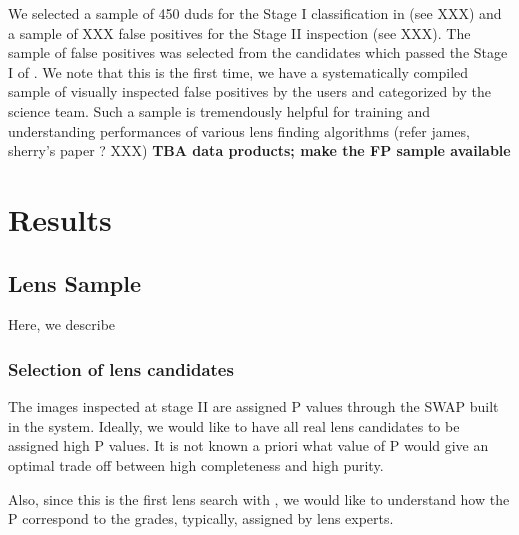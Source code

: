 \documentclass[useAMS,usenatbib,a4paper]{mn2e}
\begin{document}
We selected a sample of 450 duds for the Stage I classification in \sw
(see XXX) and a sample of XXX false positives for the Stage II
inspection (see XXX). The sample of false positives was selected from
the candidates which passed the Stage I of \sw. We note that this is the
first time, we have a systematically compiled sample of visually
inspected false positives by the \sw users and categorized by the
science team. Such a sample is tremendously helpful for training and
understanding performances of various lens finding algorithms (refer
james, sherry's paper ? XXX)
{\bf TBA data products; make the FP sample available}



\section{Results}
\label{sec:results}

\subsection{\sw Lens Sample}
Here, we describe

\subsubsection{Selection of \sw lens candidates}
\label{sec:results:stage1}
The images inspected at stage II are assigned P values through the SWAP
built in the \sw system. Ideally, we would like to have all real lens
candidates to be assigned high P values. It is not known a priori what
value of P would give an optimal trade off between high completeness
and high purity. 

Also, since this is the first lens search with \sw, we
would like to understand how the P correspond to the grades, typically,
assigned by lens experts. 
\end{document}

